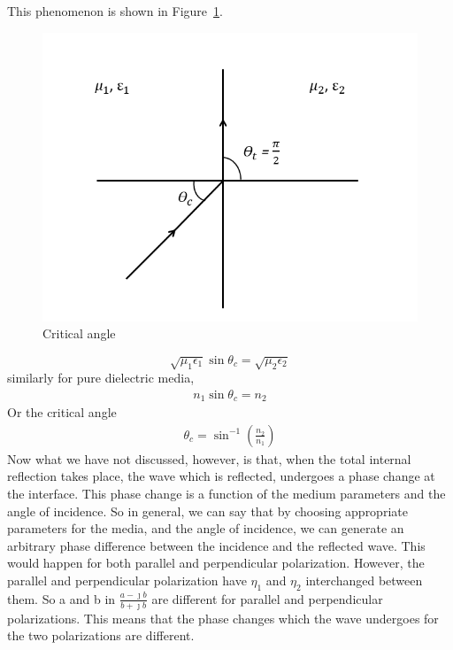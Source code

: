 \begin{enumerate}[(i)]
This phenomenon is shown in Figure~\ref {critical_angle}.
\begin{figure}[h]
\centering
\includegraphics[width=1\linewidth]{graphics/critical_angle}
\caption{Critical angle}
\label{critical_angle}
\end{figure}

\begin{equation*}
\sqrt{\mu_1\epsilon_1} \sin\theta_c = \sqrt{\mu_2\epsilon_2}
\end{equation*}
similarly for pure dielectric media, 
\begin{align*}
n_1 \sin\theta_c = n_2
\end{align*}
Or the critical angle
\begin{align*}
\theta_c = \sin^{-1}(\frac{n_2}{n_1}) 
\end{align*}
Now what we have not discussed, however, is that, when the total internal reflection takes place, the wave which is reflected, undergoes a phase change at the interface. This phase change is a function of the medium parameters and the angle of incidence. So in general, we can say that by choosing appropriate parameters for the media, and the angle of incidence, we can generate an arbitrary phase difference between the incidence and the reflected wave. This would happen for both parallel and perpendicular polarization. However, the parallel and perpendicular polarization have $\eta_1$ and $\eta_2$
interchanged between them. So a and b in $\frac{a - \jmath b}{b + \jmath b}$ are different for parallel and perpendicular polarizations. This means that the phase changes which the wave undergoes for the two polarizations are different.


\end{enumerate}
